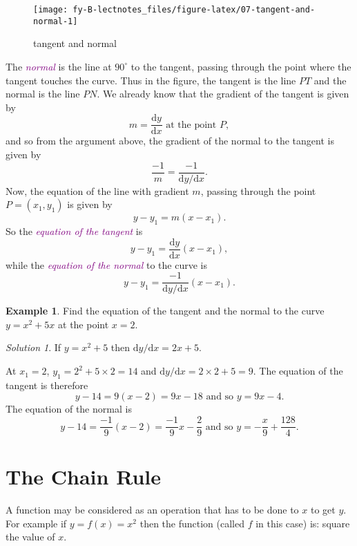 \documentclass[
  english,
  11pt,
  oneside]{book}
\newcommand{\slide}{}
\theoremstyle{definition}
\theoremstyle{definition}
\newtheorem{example}{Example}[chapter]
\theoremstyle{definition}
\theoremstyle{definition}
\theoremstyle{remark}
\newtheorem*{solution}{Solution}
\begin{document}
\begin{figure}

{\centering \texttt{[image: fy-B-lectnotes\_files/figure-latex/07-tangent-and-normal-1]} 

}

\caption{tangent and normal}\label{fig:07-tangent-and-normal}
\end{figure}
\slide

The \textcolor{purple}{\em normal} is the line at \(90^\circ\) to the tangent, passing through the point where the tangent touches the curve. Thus in the figure, the tangent is the line \(PT\) and the normal is the line \(PN\). We already know that the gradient of the tangent is given by
\[
m = \frac{\mathrm{d} y}{\mathrm{d} x}\text{ at the point }P,
\]
and so from the argument above, the gradient of the normal to the tangent is given by
\[
\frac{-1}{m} = \frac{-1}{{\mathrm{d} y/\mathrm{d} x}}.
\]
Now, the equation of the line with gradient \(m\), passing through the point \(P=(x_1,y_1)\) is given by
\[
y-y_1 = m(x-x_1).
\]
So the \textcolor{purple}{\em equation of the tangent} is
\[
y - y_1 = \frac{\mathrm{d} y}{\mathrm{d} x}(x-x_1),
\]
while the \textcolor{purple}{\em equation of the normal} to the curve is
\[
y - y_1 = \frac{-1}{{\mathrm{d} y/\mathrm{d} x}}(x-x_1).
\]
\slide

\begin{example}
Find the equation of the tangent and the normal to the curve \(y = x^2+5x\) at the point \(x=2\).
\end{example}

\begin{solution}
If \(y=x^2+5\) then \({\mathrm{d} y/\mathrm{d} x} = 2x+5\).

At \(x_1=2\), \(y_1 = 2^2 + 5\times2 = 14\) and \({\mathrm{d} y/\mathrm{d} x} = 2\times2+5=9\).
The equation of the tangent is therefore
\[
y-14=9(x-2) = 9x - 18\text{ and so }y = 9x-4.
\]
The equation of the normal is
\[
y-14=\frac{-1}{9}(x-2) = \frac{-1}{9}x - \frac{2}{9}\text{ and so }y = -\frac{x}{9}+\frac{128}{4}.
\]
\end{solution}

\slide

\section{The Chain Rule}\label{lecture-five}

A function may be considered as an operation that has to be done to \(x\) to get \(y\). For example if \(y = f(x) = x^2\) then the function (called \(f\) in this case) is: square the value of \(x\).
\end{document}
